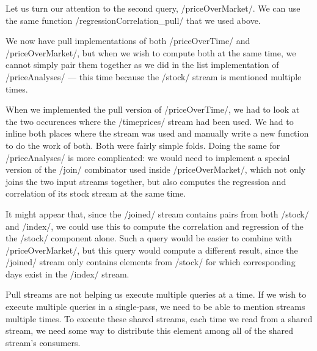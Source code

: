 
Let us turn our attention to the second query, \Hs/priceOverMarket/.
We can use the same function \Hs/regressionCorrelation_pull/ that we used above.


We now have pull implementations of both \Hs/priceOverTime/ and \Hs/priceOverMarket/, but when we wish to compute both at the same time, we cannot simply pair them together as we did in the list implementation of \Hs/priceAnalyses/ --- this time because the \Hs/stock/ stream is mentioned multiple times.

When we implemented the pull version of \Hs/priceOverTime/, we had to look at the two occurences where the \Hs/timeprices/ stream had been used.
We had to inline both places where the stream was used and manually write a new function to do the work of both.
Both were fairly simple folds.
Doing the same for \Hs/priceAnalyses/ is more complicated: we would need to implement a special version of the \Hs/join/ combinator used inside \Hs/priceOverMarket/, which not only joins the two input streams together, but also computes the regression and correlation of its stock stream at the same time.

It might appear that, since the \Hs/joined/ stream contains pairs from both \Hs/stock/ and \Hs/index/, we could use this to compute the correlation and regression of the the \Hs/stock/ component alone.
Such a query would be easier to combine with \Hs/priceOverMarket/, but this query would compute a different result, since the \Hs/joined/ stream only contains elements from \Hs/stock/ for which corresponding days exist in the \Hs/index/ stream.

Pull streams are not helping us execute multiple queries at a time.
If we wish to execute multiple queries in a single-pass, we need to be able to mention streams multiple times.
To execute these shared streams, each time we read from a shared stream, we need some way to distribute this element among all of the shared stream's consumers.

